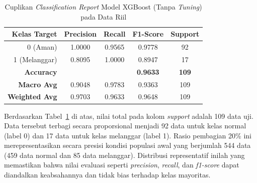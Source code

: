 \begin{table}[H]
\centering
\caption{Cuplikan \textit{Classification Report} Model XGBoost (Tanpa \textit{Tuning}) pada Data Riil}
\label{tab:xgboost_report}
\begin{tabular}{rcccc}
\toprule
\textbf{Kelas Target} & \textbf{Precision} & \textbf{Recall} & \textbf{F1-Score} & \textbf{Support} \\
\midrule
0 (Aman) & 1.0000 & 0.9565 & 0.9778 & 92 \\
1 (Melanggar) & 0.8095 & 1.0000 & 0.8947 & 17 \\
\midrule
\textbf{Accuracy} & & & \textbf{0.9633} & \textbf{109} \\
\textbf{Macro Avg} & 0.9048 & 0.9783 & 0.9363 & 109 \\
\textbf{Weighted Avg} & 0.9703 & 0.9633 & 0.9648 & 109 \\
\bottomrule
\end{tabular}
\end{table}

Berdasarkan Tabel~\ref{tab:xgboost_report} di atas, nilai total pada kolom \textit{support} adalah 109 data uji. Data tersebut terbagi secara proporsional menjadi 92 data untuk kelas normal (label 0) dan 17 data untuk kelas melanggar (label 1). Rasio pembagian 20\% ini merepresentasikan secara presisi kondisi populasi awal yang berjumlah 544 data (459 data normal dan 85 data melanggar). Distribusi representatif inilah yang memastikan bahwa nilai evaluasi seperti \textit{precision}, \textit{recall}, dan \textit{f1-score} dapat diandalkan keabsahannya dan tidak bias terhadap kelas mayoritas.